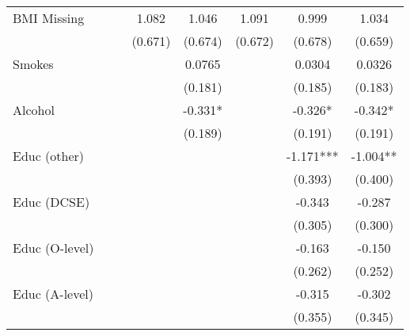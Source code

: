 \begin{table}[h!]
{\begin{tabular}{l*{7}{c}}
BMI Missing  &               &               &       1.082   &       1.046   &       1.091   &       0.999   &       1.034   \\
            &               &               &     (0.671)   &     (0.674)   &     (0.672)   &     (0.678)   &     (0.659)   \\

Smokes       &               &               &               &      0.0765   &               &      0.0304   &      0.0326   \\
            &               &               &               &     (0.181)   &               &     (0.185)   &     (0.183)   \\

Alcohol     &               &               &               &      -0.331*  &               &      -0.326*  &      -0.342*  \\
            &               &               &               &     (0.189)   &               &     (0.191)   &     (0.191)   \\

Educ (other)  &               &               &               &               &               &      -1.171***&      -1.004** \\
            &               &               &               &               &               &     (0.393)   &     (0.400)   \\

Educ (DCSE) &               &               &               &               &               &      -0.343   &      -0.287   \\
            &               &               &               &               &               &     (0.305)   &     (0.300)   \\

Educ (O-level) &               &               &               &               &               &      -0.163   &      -0.150   \\
            &               &               &               &               &               &     (0.262)   &     (0.252)   \\

Educ (A-level) &               &               &               &               &               &      -0.315   &      -0.302   \\
            &               &               &               &               &               &     (0.355)   &     (0.345)   \\


\end{tabular}}
\end{table}
